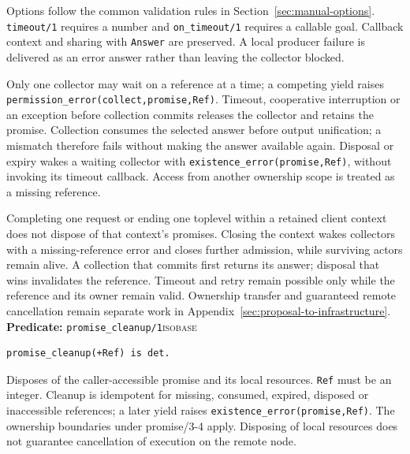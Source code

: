 Options follow the common validation rules in Section~\ref{sec:manual-options}.
\texttt{timeout/\allowbreak{}1} requires a number and
\texttt{on\_\allowbreak{}timeout/\allowbreak{}1} requires a callable goal. Callback context and
sharing with \texttt{Answer} are preserved. A local producer failure is delivered as an error answer
rather than leaving the collector blocked.

Only one collector may wait on a reference at a time; a competing yield raises
\texttt{permission\_\allowbreak{}error(\allowbreak{}collect,\allowbreak{}promise,\allowbreak{}Ref)}. Timeout, cooperative interruption or an exception
before collection commits releases the collector and retains the promise. Collection consumes the
selected answer before output unification; a mismatch therefore fails without making the answer
available again. Disposal or expiry wakes a waiting collector with
\texttt{existence\_\allowbreak{}error(\allowbreak{}promise,\allowbreak{}Ref)}, without invoking its timeout callback. Access from another
ownership scope is treated as a missing reference.

Completing one request or ending one toplevel within a retained client context
does not dispose of that context's promises. Closing the context wakes
collectors with a missing-reference error and closes
further admission, while surviving actors remain alive. A collection that commits
first returns its answer; disposal that wins invalidates the reference. Timeout
and retry remain possible only while the reference and its owner remain valid.
Ownership transfer and guaranteed remote cancellation remain separate work in
Appendix~\ref{sec:proposal-to-infrastructure}.\\

\noindent \textbf{Predicate:} \texttt{promise\_\allowbreak{}cleanup/\allowbreak{}1}\hfill\textsc{isobase}
\begin{verbatim}
promise_cleanup(+Ref) is det.
\end{verbatim}

Disposes of the caller-accessible promise and its local resources. \texttt{Ref} must be an integer.
Cleanup is idempotent for missing, consumed, expired, disposed or inaccessible references; a later
yield raises \texttt{existence\_\allowbreak{}error(\allowbreak{}promise,\allowbreak{}Ref)}. The ownership boundaries under promise/3-4
apply. Disposing of local resources does not guarantee cancellation of execution on the remote node.\\


